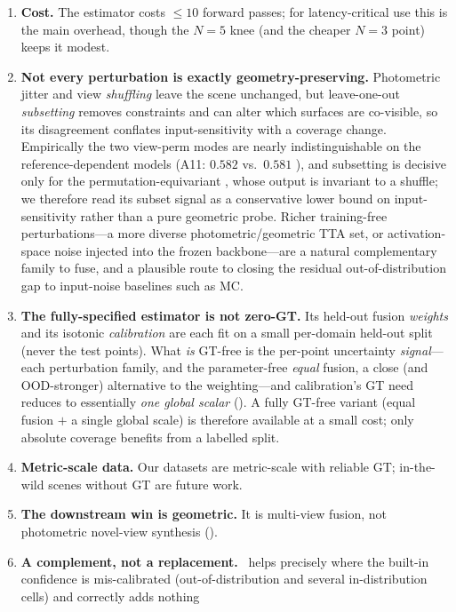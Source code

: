 \begin{enumerate}[label=(\roman*),leftmargin=1.8em,itemsep=2pt,topsep=2pt]
\item \textbf{Cost.} The estimator costs $\le 10$ forward passes; for latency-critical use this is the
main overhead, though the $N{=}5$ knee (and the cheaper $N{=}3$ point) keeps it modest.
\item \textbf{Not every perturbation is exactly geometry-preserving.} Photometric jitter and view
\emph{shuffling} leave the scene unchanged, but leave-one-out \emph{subsetting} removes constraints
and can alter which surfaces are co-visible, so its disagreement conflates input-sensitivity with a
coverage change. Empirically the two view-perm modes are nearly indistinguishable on the
reference-dependent models (A11: $0.582$ vs.\ $0.581$ \ause), and subsetting is decisive only for the
permutation-equivariant \pii, whose output is invariant to a shuffle; we therefore read its subset
signal as a conservative lower bound on input-sensitivity rather than a pure geometric probe. Richer
training-free perturbations---a more diverse photometric/geometric TTA set, or activation-space noise
injected into the frozen backbone---are a natural complementary family to fuse, and a plausible route
to closing the residual out-of-distribution gap to input-noise baselines such as MC.
\item \textbf{The fully-specified estimator is not zero-GT.} Its held-out fusion \emph{weights} and
its isotonic \emph{calibration} are each fit on a small per-domain held-out split (never the test
points). What \emph{is} GT-free is the per-point uncertainty \emph{signal}---each perturbation family,
and the parameter-free \emph{equal} fusion, a close (and OOD-stronger) alternative to the
weighting---and calibration's GT need reduces to essentially \emph{one global scalar}
(). A fully GT-free variant (equal fusion $+$ a single global scale) is therefore
available at a small cost; only absolute coverage benefits from a labelled split.
\item \textbf{Metric-scale data.} Our datasets are metric-scale with reliable GT; in-the-wild scenes
without GT are future work.
\item \textbf{The downstream win is geometric.} It is multi-view fusion, not photometric novel-view
synthesis ().
\item \textbf{A complement, not a replacement.} \trustr\ helps precisely where the built-in confidence
is mis-calibrated (out-of-distribution and several in-distribution cells) and correctly adds nothing

\end{enumerate}
